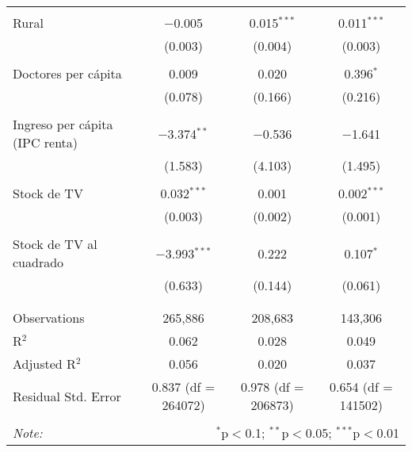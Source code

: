 \begin{table}[!htbp]
\begin{tabular}{@{\extracolsep{5pt}}lccc}
  & & & \\ 
 Rural & $-$0.005 & 0.015$^{***}$ & 0.011$^{***}$ \\ 
  & (0.003) & (0.004) & (0.003) \\ 
  & & & \\ 
 Doctores per cápita & 0.009 & 0.020 & 0.396$^{*}$ \\ 
  & (0.078) & (0.166) & (0.216) \\ 
  & & & \\ 
 Ingreso per cápita (IPC renta) & $-$3.374$^{**}$ & $-$0.536 & $-$1.641 \\ 
  & (1.583) & (4.103) & (1.495) \\ 
  & & & \\ 
 Stock de TV & 0.032$^{***}$ & 0.001 & 0.002$^{***}$ \\ 
  & (0.003) & (0.002) & (0.001) \\ 
  & & & \\ 
 Stock de TV al cuadrado & $-$3.993$^{***}$ & 0.222 & 0.107$^{*}$ \\ 
  & (0.633) & (0.144) & (0.061) \\ 
  & & & \\ 
\hline \\[-1.8ex] 
Observations & 265,886 & 208,683 & 143,306 \\ 
R$^{2}$ & 0.062 & 0.028 & 0.049 \\ 
Adjusted R$^{2}$ & 0.056 & 0.020 & 0.037 \\ 
Residual Std. Error & 0.837 (df = 264072) & 0.978 (df = 206873) & 0.654 (df = 141502) \\ 
\hline 
\hline \\[-1.8ex] 
\textit{Note:}  & \multicolumn{3}{r}{$^{*}$p$<$0.1; $^{**}$p$<$0.05; $^{***}$p$<$0.01} \\ 
\end{tabular} 
\end{table} 
